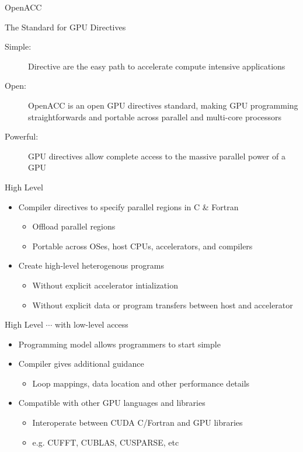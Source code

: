 \documentclass[10pt,t]{beamer}
\begin{document}
\begin{frame}[allowframebreaks]{\small OpenACC}
  \begin{exampleblock}{The Standard for GPU Directives}
    \begin{description}
      \item[Simple:] Directive are the easy path to accelerate compute intensive applications
      \item[Open:] OpenACC is an open GPU directives standard, making GPU programming straightforwards and portable across parallel and multi-core processors
      \item[Powerful:] GPU directives allow complete access to the massive parallel power of a GPU
    \end{description}
  \end{exampleblock}
  \framebreak
  \begin{exampleblock}{High Level}
    \begin{itemize}
      \item Compiler directives to specify parallel regions in C \& Fortran
      \begin{itemize}
        \item Offload parallel regions
        \item Portable across OSes, host CPUs, accelerators, and compilers
      \end{itemize}
      \item Create high-level heterogenous programs
      \begin{itemize}
        \item Without explicit accelerator intialization
        \item Without explicit data or program transfers between host and accelerator
      \end{itemize}
    \end{itemize}
  \end{exampleblock}
  \begin{exampleblock}{High Level $\cdots$ with low-level access}
    \begin{itemize}
      \item Programming model allows programmers to start simple
      \item Compiler gives additional guidance
      \begin{itemize}
        \item Loop mappings, data location and other performance details
      \end{itemize}
      \item Compatible with other GPU languages and libraries
      \begin{itemize}
        \item Interoperate between CUDA C/Fortran and GPU libraries
        \item e.g. CUFFT, CUBLAS, CUSPARSE, etc
      \end{itemize}
    \end{itemize}
  \end{exampleblock}
\end{frame}
\end{document}
